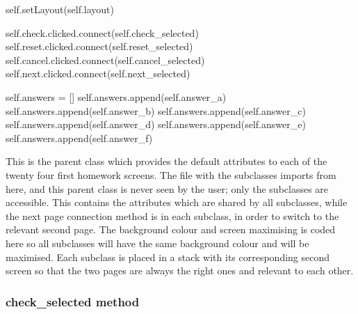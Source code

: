 \begin{python}
        self.setLayout(self.layout)

        self.check.clicked.connect(self.check_selected)
        self.reset.clicked.connect(self.reset_selected)
        self.cancel.clicked.connect(self.cancel_selected)
        self.next.clicked.connect(self.next_selected)

        self.answers = []
        self.answers.append(self.answer_a)
        self.answers.append(self.answer_b)
        self.answers.append(self.answer_c)
        self.answers.append(self.answer_d)
        self.answers.append(self.answer_e)
        self.answers.append(self.answer_f)
\end{python}

This is the parent class which provides the default attributes to each of the twenty four first homework screens. The file with the subclasses imports from here, and this parent class is never seen by the user; only the subclasses are accessible. This contains the attributes which are shared by all subclasses, while the next page connection method is in each subclass, in order to switch to the relevant second page. The background colour and screen maximising is coded here so all subclasses will have the same background colour and will be maximised. Each subclass is placed in a stack with its corresponding second screen so that the two pages are always the right ones and relevant to each other.

\subsubsection{check\_selected method}

